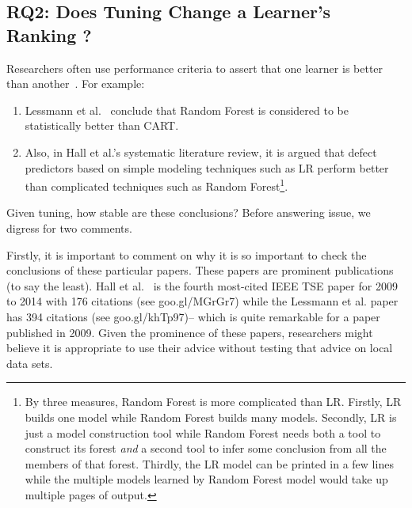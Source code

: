 \documentclass{sig-alternative}
\newcommand{\be}{\begin{enumerate}}
\newcommand{\ee}{\end{enumerate}}
\begin{document}
\subsection{RQ2:  Does Tuning Change a Learner's Ranking ?}\label{sect:rank}
Researchers often use performance criteria to assert that one learner is better than 
another~\cite{lessmann2008benchmarking,me07b,hall11}. For example:
\be
\item
Lessmann et al.~\cite{lessmann2008benchmarking} conclude that
Random Forest is considered to be statistically 
better than CART. 
\item
Also, in Hall et al.'s   systematic literature review\cite{hall11}, it is argued
that defect predictors based on simple 
modeling techniques such as LR perform better than complicated techniques such as Random Forest\footnote{By three measures,
Random Forest
is more complicated than LR. Firstly, LR builds one model
while Random Forest builds many models. Secondly, LR is just
a model construction tool while Random Forest needs both
a tool to construct its forest {\em and} a second tool
to  infer some conclusion from all the members of that forest.
Thirdly, the LR model can be printed in a few lines while the multiple
models learned by Random
Forest model would take up multiple pages of output.}.
\ee
Given tuning, how stable are these  conclusions?
Before answering issue, we digress for two comments.



Firstly, it is important to comment on why it is  so important to check the conclusions
of these particular papers. 
These  papers are prominent publications (to say the least).
Hall et al.~\cite{hall11} is the fourth most-cited IEEE TSE
paper for 2009 to 2014 with 176 citations (see goo.gl/MGrGr7)
while the Lessmann et al. paper~\cite{lessmann2008benchmarking} has 394 citations (see
goo.gl/khTp97)-- which is quite remarkable for a paper published in 2009.
Given the prominence
of these papers, researchers might believe it is
appropriate to
  use  their advice without testing that advice on local data sets.
\end{document}
